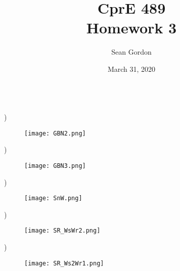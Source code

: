 \documentclass[12pt]{article}
\title{CprE 489\\Homework 3}
\author{Sean Gordon}
\date{March 31, 2020}
\begin{document}
\maketitle


\hrulefill \\


)
\begin{figure}[h!]
  \centering
  \texttt{[image: GBN2.png]}
\end{figure}

)
\begin{figure}[h!]
  \centering
  \texttt{[image: GBN3.png]}
\end{figure}

\pagebreak

)
\begin{figure}[h!]
  \centering
  \texttt{[image: SnW.png]}
\end{figure}

)
\begin{figure}[h!]
  \centering
  \texttt{[image: SR\_WsWr2.png]}
\end{figure}

)
\begin{figure}[h!]
  \centering
  \texttt{[image: SR\_Ws2Wr1.png]}
\end{figure}
\end{document}
